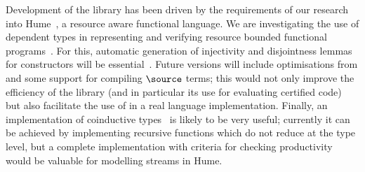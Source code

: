 
Development of the library has been driven by the requirements of
our research into Hume~\cite{Hume-GPCE}, a resource aware functional
language. We are investigating the use of dependent types in
representing and verifying resource bounded functional
programs~\cite{dt-framework}.
For this, automatic generation of
injectivity and disjointness lemmas for constructors will be
essential~\cite{concon}.
Future versions will include
optimisations from \cite{brady-thesis} and some support for compiling
$\source$ terms; this would not only improve the efficiency of the
library (and in particular its use for evaluating certified code)
but also facilitate the use of \Ivor{} in a real language
implementation. Finally, an implementation of coinductive
types~\cite{coinductive} is likely to be very useful; currently it can
be achieved by implementing recursive functions which do not reduce at
the type level, but a complete implementation with criteria for
checking productivity would be valuable for modelling streams in Hume.
